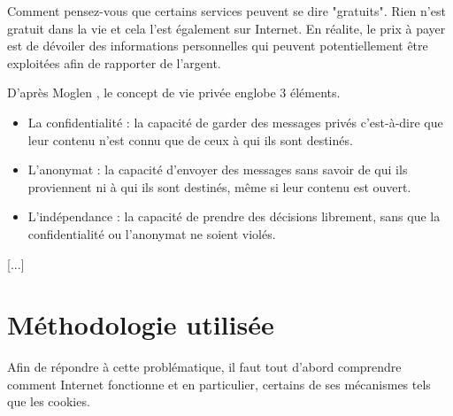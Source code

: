 Comment pensez-vous que certains services peuvent se dire "gratuits". Rien n'est gratuit dans la vie et cela l'est également sur Internet. En réalite, le prix à payer est de dévoiler des informations personnelles qui peuvent potentiellement être exploitées afin de rapporter de l'argent.
\newline


D'après Moglen \cite{Moglen_part2}, le concept de vie privée englobe 3 éléments.
\begin{itemize}
  \item La confidentialité : la capacité de garder des messages privés c'est-à-dire que leur contenu n'est connu que de ceux à qui ils sont destinés.
  \item L'anonymat : la capacité d'envoyer des messages sans savoir de qui ils proviennent ni à qui ils sont destinés, même si leur contenu est ouvert.
  \item L'indépendance : la capacité de prendre des décisions librement, sans que la confidentialité ou l'anonymat ne soient violés.
  \newline
\end{itemize}

[...]




\section{Méthodologie utilisée}
Afin de répondre à cette problématique, il faut tout d'abord comprendre comment Internet fonctionne et en particulier, certains de ses mécanismes tels que les cookies.


